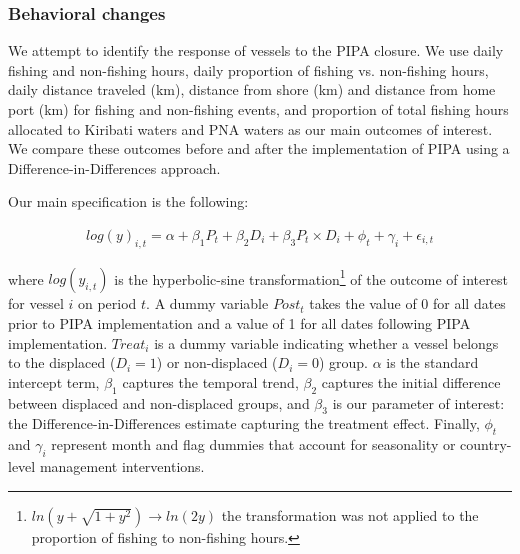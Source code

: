 \documentclass[9p,twocolumn,twoside,lineno]{pnas-new}
\begin{document}
\begin{scriptsize}
\subsubsection{Behavioral changes}

We attempt to identify the response of vessels to the PIPA closure. We use daily fishing and non-fishing hours, daily proportion of fishing vs. non-fishing hours, daily distance traveled (km), distance from shore (km) and distance from home port (km) for fishing and non-fishing events, and proportion of total fishing hours allocated to Kiribati waters and PNA waters as our main outcomes of interest. We compare these outcomes before and after the implementation of PIPA using a Difference-in-Differences approach. 

Our main specification is the following:

\begin{figure}[H]
\begin{align}
log(y)_{i,t} = \alpha + \beta_1 P_t + \beta_2 D_i + \beta_3 P_t \times D_i + \phi_t + \gamma_i + \epsilon_{i,t}
\label{eqn:did}
\end{align}
\end{figure}

\noindent where $log(y_{i,t})$ is the hyperbolic-sine transformation\footnote{$ln\left(y + \sqrt{1 + y^2}\right)\rightarrow ln(2y)$ the transformation was not applied to the proportion of fishing to non-fishing hours.} of the outcome of interest for vessel $i$ on period $t$. A dummy variable $Post_t$ takes the value of 0 for all dates prior to PIPA implementation and a value of 1 for all dates following PIPA implementation. $Treat_i$ is a dummy variable indicating whether a vessel belongs to the displaced ($D_i = 1$) or non-displaced ($D_i = 0$) group. $\alpha$ is the standard intercept term, $\beta_1$ captures the temporal trend, $\beta_2$ captures the initial difference between displaced and non-displaced groups, and $\beta_3$ is our parameter of interest: the Difference-in-Differences estimate capturing the treatment effect. Finally, $\phi_t$ and $\gamma_i$ represent month and flag dummies that account for seasonality or country-level management interventions. 

\end{scriptsize}
\end{document}
